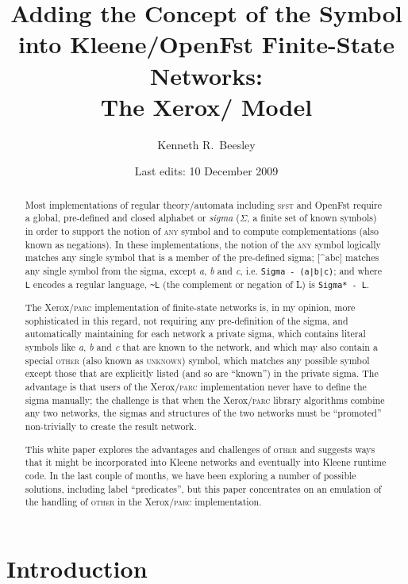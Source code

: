 \documentclass[letterpaper,11pt]{article}
\title{Adding the Concept of the \acro{other} Symbol\\
into Kleene/OpenFst Finite-State Networks:\\
The Xerox/\acro{parc} Model}
\author{Kenneth R.~Beesley}
\date{Last edits: 10 December 2009}
\providecommand{\acro}{}\renewcommand{\acro}{\textsc}
\begin{document}
\maketitle

\begin{abstract}
Most implementations of regular theory/automata 
including \acro{sfst} and OpenFst require a
global, pre-defined and closed alphabet or \emph{sigma} ($\Sigma$, a finite set
of known symbols) in order to support the notion of 
\acro{any} symbol and
to compute complementations (also known as negations).  In these implementations,
the notion of the
\acro{any} symbol logically matches
any single symbol that is a member of the pre-defined sigma; [\^{}abc] matches any single symbol
from the sigma, except \emph{a}, \emph{b} and \emph{c}, i.e.\@
\texttt{Sigma -
(a|b|c)}; and where \verb!L! encodes a regular language, \verb!~L!
(the complement or negation of L) is \texttt{Sigma* - L}.  

The Xerox/\acro{parc} implementation of finite-state networks is, in my opinion,
more sophisticated in this regard, not requiring any pre-definition
of the sigma, and
automatically maintaining for each network a private sigma, which contains literal
symbols like \emph{a}, \emph{b} and \emph{c} that are known to the network, and
which may also contain a special \acro{other} (also known as \acro{unknown}) symbol, 
which matches any possible symbol except those that are explicitly
listed (and so are ``known'') in the private sigma.  
The advantage is that users of the Xerox/\acro{parc} implementation
never have to define the sigma manually; the challenge is that when the Xerox/\acro{parc} library
algorithms combine any two networks, the sigmas and structures of the two networks must be
``promoted'' non-trivially to create the result network.

This white paper explores the advantages and challenges of \acro{other} and suggests ways that it might be
incorporated into Kleene networks and eventually into Kleene runtime code.
In the last couple of months, we have been exploring a number of possible
solutions, including label ``predicates'', 
but this paper concentrates on an emulation of the
handling of \acro{other} in the Xerox/\acro{parc} implementation.
\end{abstract}

\newpage

\section{Introduction}
\end{document}

